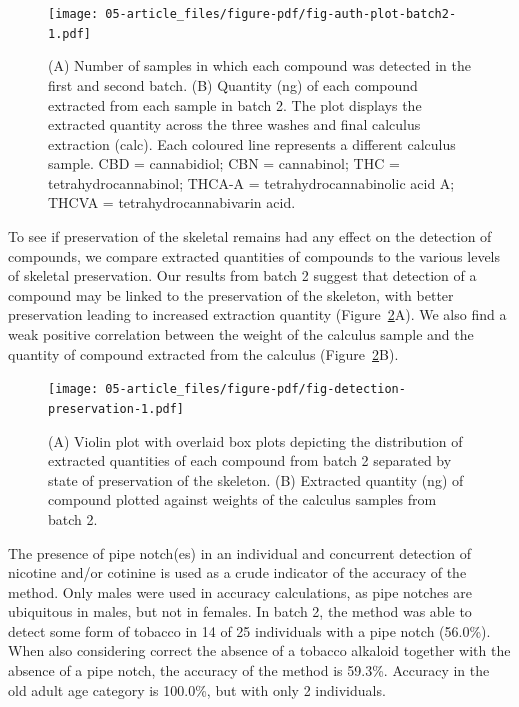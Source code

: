 \documentclass[
  b5paper,
]{book}
\begin{document}
\begin{figure}

{\centering \texttt{[image: 05-article\_files/figure-pdf/fig-auth-plot-batch2-1.pdf]}

}

\caption{\label{fig-auth-plot-batch2}(A) Number of samples in which each
compound was detected in the first and second batch. (B) Quantity (ng)
of each compound extracted from each sample in batch 2. The plot
displays the extracted quantity across the three washes and final
calculus extraction (calc). Each coloured line represents a different
calculus sample. CBD = cannabidiol; CBN = cannabinol; THC =
tetrahydrocannabinol; THCA-A = tetrahydrocannabinolic acid A; THCVA =
tetrahydrocannabivarin acid.}

\end{figure}

To see if preservation of the skeletal remains had any effect on the
detection of compounds, we compare extracted quantities of compounds to
the various levels of skeletal preservation. Our results from batch 2
suggest that detection of a compound may be linked to the preservation
of the skeleton, with better preservation leading to increased
extraction quantity (Figure~\ref{fig-detection-preservation}A). We also
find a weak positive correlation between the weight of the calculus
sample and the quantity of compound extracted from the calculus
(Figure~\ref{fig-detection-preservation}B).

\begin{figure}

{\centering \texttt{[image: 05-article\_files/figure-pdf/fig-detection-preservation-1.pdf]}

}

\caption{\label{fig-detection-preservation}(A) Violin plot with overlaid
box plots depicting the distribution of extracted quantities of each
compound from batch 2 separated by state of preservation of the
skeleton. (B) Extracted quantity (ng) of compound plotted against
weights of the calculus samples from batch 2.}

\end{figure}

The presence of pipe notch(es) in an individual and concurrent detection
of nicotine and/or cotinine is used as a crude indicator of the accuracy
of the method. Only males were used in accuracy calculations, as pipe
notches are ubiquitous in males, but not in females. In batch 2, the
method was able to detect some form of tobacco in 14 of 25 individuals
with a pipe notch (56.0\%). When also considering correct the absence of
a tobacco alkaloid together with the absence of a pipe notch, the
accuracy of the method is 59.3\%. Accuracy in the old adult age category
is 100.0\%, but with only 2 individuals.
\end{document}
